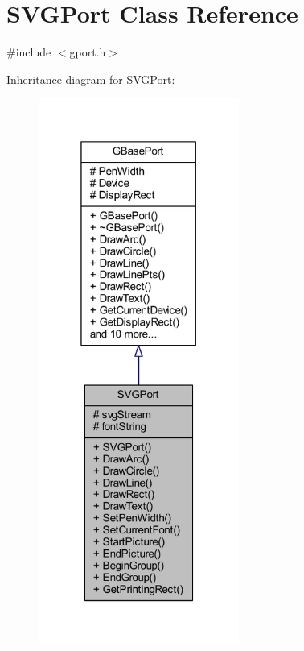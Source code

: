 \hypertarget{class_s_v_g_port}{}\section{S\+V\+G\+Port Class Reference}
\label{class_s_v_g_port}


{\ttfamily \#include $<$gport.\+h$>$}



Inheritance diagram for S\+V\+G\+Port\+:\nopagebreak
\begin{figure}[H]
\begin{center}
\leavevmode
\includegraphics[width=187pt]{class_s_v_g_port__inherit__graph}
\end{center}
\end{figure}


